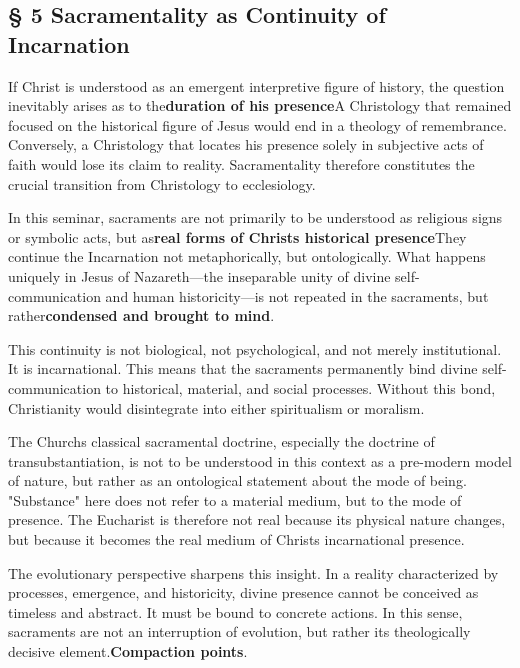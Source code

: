 \documentclass[
]{article}
\begin{document}
\subsection{\texorpdfstring{\textbf{§ 5 Sacramentality as Continuity of Incarnation}}{§ 5 Sacramentality as Continuity of Incarnation}}\label{sacramentality-as-continuity-of-incarnation}

If Christ is understood as an emergent interpretive figure of history, the question inevitably arises as to the\textbf{duration of his presence}A Christology that remained focused on the historical figure of Jesus would end in a theology of remembrance. Conversely, a Christology that locates his presence solely in subjective acts of faith would lose its claim to reality. Sacramentality therefore constitutes the crucial transition from Christology to ecclesiology.

In this seminar, sacraments are not primarily to be understood as religious signs or symbolic acts, but as\textbf{real forms of Christ\textquotesingle s historical presence}They continue the Incarnation not metaphorically, but ontologically. What happens uniquely in Jesus of Nazareth---the inseparable unity of divine self-communication and human historicity---is not repeated in the sacraments, but rather\textbf{condensed and brought to mind}.

This continuity is not biological, not psychological, and not merely institutional. It is incarnational. This means that the sacraments permanently bind divine self-communication to historical, material, and social processes. Without this bond, Christianity would disintegrate into either spiritualism or moralism.

The Church\textquotesingle s classical sacramental doctrine, especially the doctrine of transubstantiation, is not to be understood in this context as a pre-modern model of nature, but rather as an ontological statement about the mode of being. "Substance" here does not refer to a material medium, but to the mode of presence. The Eucharist is therefore not real because its physical nature changes, but because it becomes the real medium of Christ\textquotesingle s incarnational presence.

The evolutionary perspective sharpens this insight. In a reality characterized by processes, emergence, and historicity, divine presence cannot be conceived as timeless and abstract. It must be bound to concrete actions. In this sense, sacraments are not an interruption of evolution, but rather its theologically decisive element.\textbf{Compaction points}.
\end{document}
